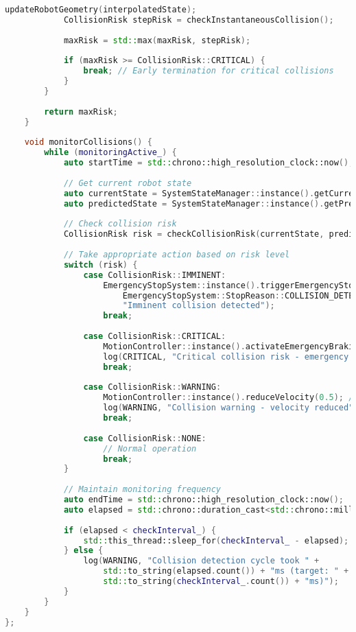 \begin{lstlisting}[language=C++, caption=Advanced Collision Detection System]
            updateRobotGeometry(interpolatedState);
            CollisionRisk stepRisk = checkInstantaneousCollision();
            
            maxRisk = std::max(maxRisk, stepRisk);
            
            if (maxRisk >= CollisionRisk::CRITICAL) {
                break; // Early termination for critical collisions
            }
        }
        
        return maxRisk;
    }
    
    void monitorCollisions() {
        while (monitoringActive_) {
            auto startTime = std::chrono::high_resolution_clock::now();
            
            // Get current robot state
            auto currentState = SystemStateManager::instance().getCurrentRobotState();
            auto predictedState = SystemStateManager::instance().getPredictedRobotState(0.1); // 100ms ahead
            
            // Check collision risk
            CollisionRisk risk = checkCollisionRisk(currentState, predictedState, 0.1);
            
            // Take appropriate action based on risk level
            switch (risk) {
                case CollisionRisk::IMMINENT:
                    EmergencyStopSystem::instance().triggerEmergencyStop(
                        EmergencyStopSystem::StopReason::COLLISION_DETECTED,
                        "Imminent collision detected");
                    break;
                    
                case CollisionRisk::CRITICAL:
                    MotionController::instance().activateEmergencyBraking();
                    log(CRITICAL, "Critical collision risk - emergency braking activated");
                    break;
                    
                case CollisionRisk::WARNING:
                    MotionController::instance().reduceVelocity(0.5); // 50% speed reduction
                    log(WARNING, "Collision warning - velocity reduced");
                    break;
                    
                case CollisionRisk::NONE:
                    // Normal operation
                    break;
            }
            
            // Maintain monitoring frequency
            auto endTime = std::chrono::high_resolution_clock::now();
            auto elapsed = std::chrono::duration_cast<std::chrono::milliseconds>(endTime - startTime);
            
            if (elapsed < checkInterval_) {
                std::this_thread::sleep_for(checkInterval_ - elapsed);
            } else {
                log(WARNING, "Collision detection cycle took " + 
                    std::to_string(elapsed.count()) + "ms (target: " + 
                    std::to_string(checkInterval_.count()) + "ms)");
            }
        }
    }
};
\end{lstlisting}


